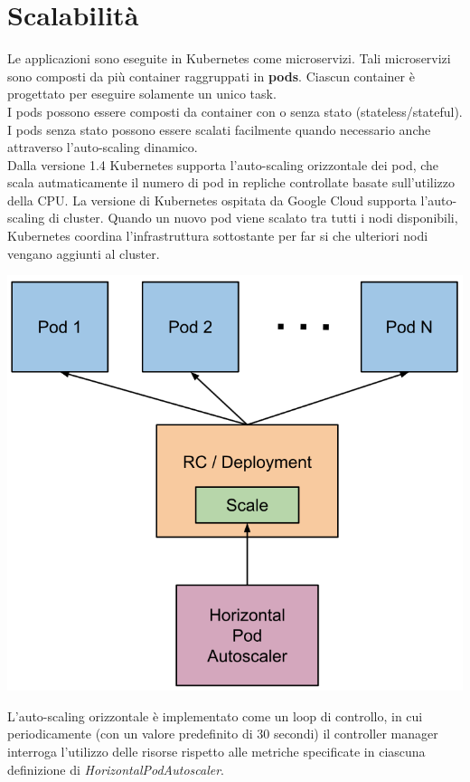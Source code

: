 \documentclass[12pt, a4paper]{report}
\begin{document}
\section{Scalabilità}
Le applicazioni sono eseguite in Kubernetes come microservizi. Tali microservizi sono composti da più container raggruppati in \textbf{pods}. Ciascun container è progettato per eseguire solamente un unico task.\\
I pods possono essere composti da container con o senza stato (stateless/stateful). I pods senza stato possono essere scalati facilmente quando necessario anche attraverso l'auto-scaling dinamico.\\
Dalla versione 1.4 Kubernetes supporta l'auto-scaling orizzontale dei pod, che scala autmaticamente il numero di pod in repliche controllate basate sull'utilizzo della CPU. La versione di Kubernetes ospitata da Google Cloud supporta l'auto-scaling di cluster. Quando un nuovo pod viene scalato tra tutti i nodi disponibili, Kubernetes coordina l'infrastruttura sottostante per far si che ulteriori nodi vengano aggiunti al cluster. \\
  \begin{center}
  \includegraphics[scale = 0.7]{Images/horizontal-pod-autoscaler}
  \end{center}
L'auto-scaling orizzontale è implementato come un loop di controllo, in cui periodicamente (con un valore predefinito di 30 secondi) il controller manager interroga l'utilizzo delle risorse rispetto alle metriche specificate in ciascuna definizione di \textit{HorizontalPodAutoscaler}.
\end{document}
